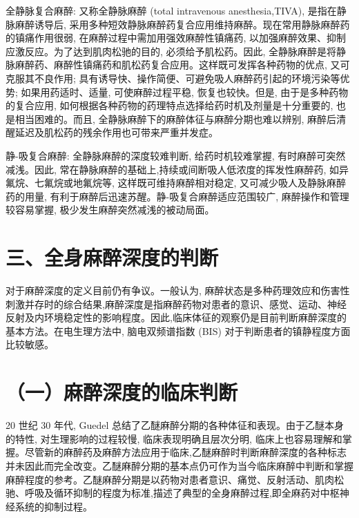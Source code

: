 \documentclass[10pt]{article}
\begin{document}
全静脉复合麻醉: 又称全静脉麻醉 (total intravenous anesthesia,TIVA), 是指在静脉麻醉诱导后, 采用多种短效静脉麻醉药复合应用维持麻醉。现在常用静脉麻醉药的镇痛作用很弱, 在麻醉过程中需加用强效麻醉性镇痛药, 以加强麻醉效果、抑制应激反应。为了达到肌肉松驰的目的, 必须给予肌松药。因此, 全静脉麻醉是将静脉麻醉药、麻醉性镇痛药和肌松药复合应用。这样既可发挥各种药物的优点, 又可克服其不良作用; 具有诱导快、操作简便、可避免吸人麻醉药引起的环境污染等优势; 如果用药适时、适量, 可使麻醉过程平稳, 恢复也较快。但是, 由于是多种药物的复合应用, 如何根据各种药物的药理特点选择给药时机及剂量是十分重要的, 也是相当困难的。而且, 全静脉麻醉下的麻醉体征与麻醉分期也难以辨别, 麻醉后清醒延迟及肌松药的残余作用也可带来严重并发症。

静-吸复合麻醉: 全静脉麻醉的深度较难判断, 给药时机较难掌握, 有时麻醉可突然减浅。因此, 常在静脉麻醉的基础上,持续或间断吸人低浓度的挥发性麻醉药, 如异氟烷、七氟烷或地氟烷等, 这样既可维持麻醉相对稳定, 又可减少吸人及静脉麻醉药的用量, 有利于麻醉后迅速苏醒。静-吸复合麻醉适应范围较广, 麻醉操作和管理较容易掌握, 极少发生麻醉突然减浅的被动局面。

\section*{三、全身麻醉深度的判断}
对于麻醉深度的定义目前仍有争议。一般认为, 麻醉状态是多种药理效应和伤害性刺激并存时的综合结果,麻醉深度是指麻醉药物对患者的意识、感觉、运动、神经反射及内环境稳定性的影响程度。因此,临床体征的观察仍是目前判断麻醉深度的基本方法。在电生理方法中, 脑电双频谱指数 (BIS) 对于判断患者的镇静程度方面比较敏感。

\section*{（一）麻醉深度的临床判断}
20 世纪 30 年代, Guedel 总结了乙醚麻醉分期的各种体征和表现。由于乙醚本身的特性, 对生理影响的过程较慢, 临床表现明确且层次分明, 临床上也容易理解和掌握。尽管新的麻醉药及麻醉方法应用于临床,乙醚麻醉时判断麻醉深度的各种标志并未因此而完全改变。乙醚麻醉分期的基本点仍可作为当今临床麻醉中判断和掌握麻醉程度的参考。乙醚麻醉分期是以药物对患者意识、痛觉、反射活动、肌肉松驰、呼吸及循环抑制的程度为标准,描述了典型的全身麻醉过程,即全麻药对中枢神经系统的抑制过程。
\end{document}
